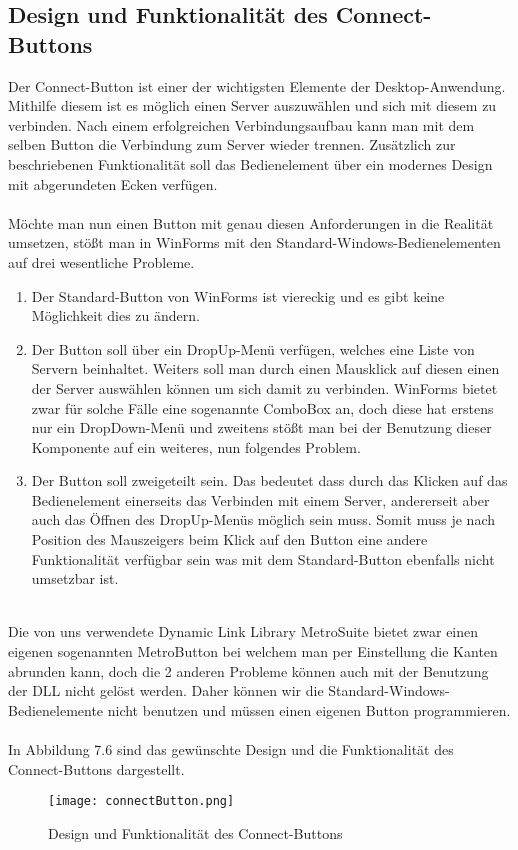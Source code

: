 \subsection{Design und Funktionalität des Connect-Buttons}

Der Connect-Button ist einer der wichtigsten Elemente der Desktop-Anwendung. Mithilfe diesem ist es möglich einen Server auszuwählen und sich mit diesem zu verbinden. Nach einem erfolgreichen Verbindungsaufbau kann man mit dem selben Button die Verbindung zum Server wieder trennen. Zusätzlich zur beschriebenen Funktionalität soll das Bedienelement über ein modernes Design mit abgerundeten Ecken verfügen.
\\ \ \\
Möchte man nun einen Button mit genau diesen Anforderungen in die Realität umsetzen, stößt man in WinForms mit den Standard-Windows-Bedienelementen auf drei wesentliche Probleme.
\\
\begin{enumerate}
 \item Der Standard-Button von WinForms ist viereckig und es gibt keine Möglichkeit dies zu ändern.
 \item Der Button soll über ein DropUp-Menü verfügen, welches eine Liste von Servern beinhaltet. Weiters soll man durch einen Mausklick auf diesen einen der Server auswählen können um sich damit zu verbinden. WinForms bietet zwar für solche Fälle eine sogenannte ComboBox an, doch diese hat erstens nur ein DropDown-Menü und zweitens stößt man bei der Benutzung dieser Komponente auf ein weiteres, nun folgendes Problem.
 \item Der Button soll zweigeteilt sein. Das bedeutet dass durch das Klicken auf das Bedienelement einerseits das Verbinden mit einem Server, andererseit aber auch das Öffnen des DropUp-Menüs möglich sein muss. Somit muss je nach Position des Mauszeigers beim Klick auf den Button eine andere Funktionalität verfügbar sein was mit dem Standard-Button ebenfalls nicht umsetzbar ist.
\end{enumerate}
\ \\
Die von uns verwendete Dynamic Link Library MetroSuite bietet zwar einen eigenen sogenannten MetroButton bei welchem man per Einstellung die Kanten abrunden kann, doch die 2 anderen Probleme können auch mit der Benutzung der DLL nicht gelöst werden. Daher können wir die Standard-Windows-Bedienelemente nicht benutzen und müssen einen eigenen Button programmieren.
\\ \ \\
In Abbildung 7.6 sind das gewünschte Design und die Funktionalität des Connect-Buttons dargestellt.
\begin{figure}[H]
    \centering
    \texttt{[image: connectButton.png]}
    \caption{Design und Funktionalität des Connect-Buttons} 
\end{figure}

